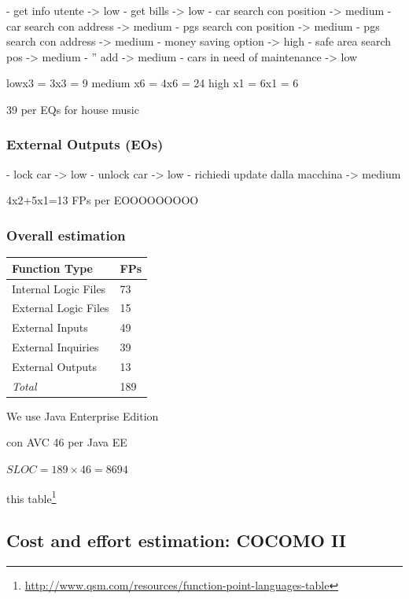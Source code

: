 \documentclass[english]{article}
\begin{document}
- get info utente -> low
- get bills -> low
- car search con position -> medium
- car search con address -> medium
- pgs search con position -> medium
- pgs search con address -> medium
- money saving option -> high
- safe area search pos -> medium
- '' add -> medium
- cars in need of maintenance -> low

lowx3 = 3x3 = 9
medium x6 = 4x6 = 24
high x1 = 6x1 = 6

39 per EQs for house music

\subsubsection{External Outputs (EOs)}

- lock car -> low
- unlock car -> low
- richiedi update dalla macchina -> medium

4x2+5x1=13 FPs per EOOOOOOOOO

\subsubsection{Overall estimation}


\begin{center}
	\begin{tabular}{|p{5cm}|p{1cm}|}
		\hline
		\textbf{Function Type} & \textbf{FPs} \\
		\hline
		Internal Logic Files & 73 \\
		External Logic Files & 15 \\
		External Inputs & 49 \\
		External Inquiries & 39 \\
		External Outputs & 13 \\
		\hline
		\textit{Total} & 189 \\
		\hline
	\end{tabular}
\end{center}

We use Java Enterprise Edition

con AVC 46 per Java EE

\begin{center}
$SLOC = 189 \times 46 = 8694$
\end{center}

this table\footnote{\href{http://www.qsm.com/resources/function-point-languages-table}{http://www.qsm.com/resources/function-point-languages-table}}



\subsection{Cost and effort estimation: COCOMO II}
\end{document}
